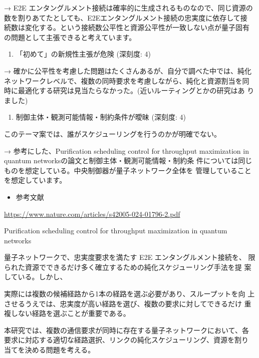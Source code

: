 \documentclass[conference]{IEEEtran}
\begin{document}
→ E2E エンタングルメント接続は確率的に生成されるものなので、同じ資源の
数を割りあてたとしても、E2Eエンタングルメント接続の忠実度に依存して接
続数は変化する。という接続数公平性と資源公平性が一致しない点が量子固有
の問題として主張できると考えています。

\begin{enumerate}
\item 「初めて」の新規性主張が危険 (深刻度: 4)
\end{enumerate}

→ 確かに公平性を考慮した問題はたくさんあるが、自分で調べた中では、純化
ネットワークレベルで、複数の同時要求を考慮しながら、純化と資源割当を同
時に最適化する研究は見当たらなかった。(近いルーティングとかの研究はあ
りました)

\begin{enumerate}
\item 制御主体・観測可能情報・制約条件が曖昧 (深刻度: 4)
\end{enumerate}
このテーマ案では、誰がスケジューリングを行うのかが明確でない。

→ 参考にした、Purification scheduling control for throughput
maximization in quantum networksの論文と制御主体・観測可能情報・制約条
件については同じものを想定している。中央制御器が量子ネットワーク全体を
管理していることを想定しています。




\begin{itemize}
\item 参考文献
\end{itemize}
\url{https://www.nature.com/articles/s42005-024-01796-2.pdf}



Purification scheduling control for throughput maximization in quantum
networks

量子ネットワークで、忠実度要求を満たす E2E エンタングルメント接続を、
限られた資源でできるだけ多く確立するための純化スケジューリング手法を提
案している。しかし、




実際には複数の候補経路から1本の経路を選ぶ必要があり、スループットを向
上させるうえでは、忠実度が高い経路を選び、複数の要求に対してできるだけ
重複しない経路を選ぶことが重要である。

本研究では、複数の通信要求が同時に存在する量子ネットワークにおいて、各
要求に対応する適切な経路選択、リンクの純化スケジューリング、資源を割り
当てを決める問題を考える。
\end{document}
